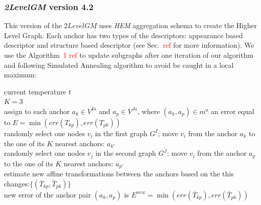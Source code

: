 \documentclass[
	fontsize=12pt,
	paper=a4,
	twoside=false,
	numbers=noenddot,
	plainheadsepline,
	toc=listof,
	toc=bibliography
]{scrartcl}
\newcommand\ToDo[1]{\textcolor{red}{#1}}
\begin{document}
\subsubsection{\emph{2LevelGM} version 4.2}

This version of the $2LevelGM$ uses \emph{HEM} aggregation schema to create the Higher Level Graph. Each anchor has two types of the descriptors: appearance based descriptor and structure based descriptor (see Sec.~\ToDo{ref} for more information). We use the Algorithm~\ToDo{1 ref} to update subgraphs after one iteration of our algorithm and following Simulated Annealing algorithm to avoid be caught in a local maximum:

\vspace{10pt}
\setcounter{algocf}{1}
\begin{algorithm}[H]
		\hspace{45pt}current temperature $t$\\
	\nl $K=3$\\
	\nl assign to each anchor $a_k\in V^{Ia}$ and $a_p\in V^{Ja}$, where $(a_k, a_p)\in m^a$ an error equal to $E = \min(err(T_{kp}), err(T_{pk}))$\\
	\nl randomly select one nodes $v_i$ in the first graph $G^I$; move $v_i$ from the anchor $a_k$ to the one of its $K$ nearest anchors: $a_{k'}$\\
	\nl randomly select one nodes $v_j$ in the second graph $G^J$; move $v_i$ from the anchor $a_p$ to the one of its $K$ nearest anchors: $a_{p'}$\\
	\nl estimate new affine transformations between the anchors based on the this changes:$\{(\bar{T}_{kp}, \bar{T}_{pk})\}$ \\
	\nl new error of the anchor pair  $(a_k, a_p)$ is $E^{new}=\min(err(\bar{T}_{kp}), err(\bar{T}_{pk}))$\\

\end{algorithm}
\end{document}

